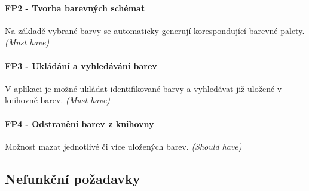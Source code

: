 \paragraph{FP2 - Tvorba barevných schémat} Na základě vybrané barvy se automaticky generují korespondující barevné palety. \emph{(Must have)} 
\paragraph{FP3 - Ukládání a vyhledávání barev} V aplikaci je možné ukládat identifikované barvy a vyhledávat již uložené v knihovně barev. \emph{(Must have)} 
\paragraph{FP4 - Odstranění barev z knihovny} Možnost mazat jednotlivé či více uložených barev. \emph{(Should have)} 

\subsection{Nefunkční požadavky}
